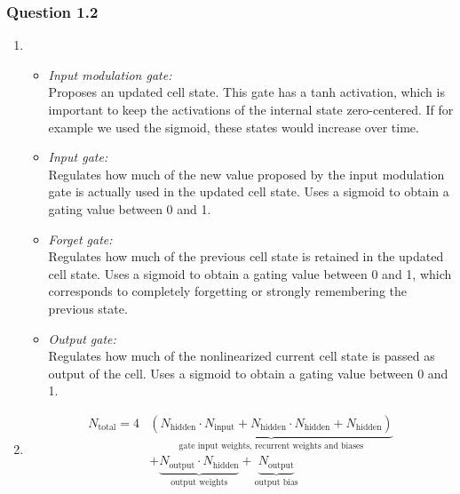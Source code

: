 \documentclass{article}
\begin{document}
\subsubsection*{Question 1.2}
\begin{enumerate}[label=(\alph*)]
	\item
	\begin{itemize}
		\item \textit{Input modulation gate:} \\Proposes an updated cell state. This gate has a tanh activation, which is important to keep the activations of the internal state zero-centered. If for example we used the sigmoid, these states would increase over time. \\
		\item \textit{Input gate:}\\ Regulates how much of the new value proposed by the input modulation gate is actually used in the updated cell state. Uses a sigmoid to obtain a gating value between 0 and 1.\\
		\item \textit{Forget gate:}\\ Regulates how much of the previous cell state is retained in the updated cell state. Uses a sigmoid to obtain a gating value between 0 and 1, which corresponds to completely forgetting or strongly remembering the previous state. \\
		\item \textit{Output gate:}\\ Regulates how much of the nonlinearized current cell state is passed as output of the cell. Uses a sigmoid to obtain a gating value between 0 and 1.\\
	\end{itemize}
	\item 
	$$
	\begin{aligned}
	N_{\text{total}} = 4&\underbrace{\left(N_{\text{hidden}}\cdot N_{\text{input}} + N_{\text{hidden}}\cdot N_{\text{hidden}} + N_{\text{hidden}}\right)}_{\text{gate input weights, recurrent weights and biases}} \\ &+ \underbrace{N_{\text{output}}\cdot N_{\text{hidden}}}_{\text{output weights}} + \underbrace{N_{\text{output}}}_{\text{output bias}}
	\end{aligned}
	$$
\end{enumerate}
\end{document}
